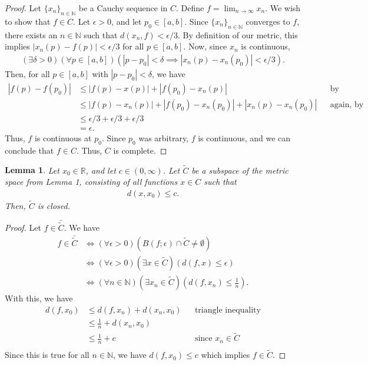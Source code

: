 \documentclass[10pt,a4paper]{article}
\theoremstyle{theorem}
\newtheorem{lemma}{Lemma}
\theoremstyle{definition}
\begin{document}
\begin{proof}
Let $\{x_n\}_{n \in \mathbb{N}}$ be a Cauchy sequence in $C$.  Define $f = \lim_{n \to \infty} x_n$.  We wish to show that $f \in C$. Let $\epsilon > 0$, and let $p_0 \in [a, b]$. Since $\{x_n\}_{n \in \mathbb{N}}$ converges to $f$, there exists an $n \in \mathbb{N}$ such that $d(x_n, f) < \epsilon/3$. By definition of our metric, this implies $|x_n(p) - f(p)| < \epsilon/3$ for all $p \in [a, b]$.  Now, since $x_n$ is continuous, 
\begin{align*}
(\exists \delta > 0)(\forall p \in [a, b])(|p - p_0| < \delta \implies |x_n(p) - x_n(p_0)| < \epsilon/3).
\end{align*}
Then, for all $p \in [a, b]$ with $|p-p_0| < \delta$, we have 
\begin{align*}
|f(p) - f(p_0)| &\leq |f(p) - x(p)|  + |f(p_0) - x_n(p)| && \text{by triangle inequality}\\
&\leq |f(p) - x_n(p)|  + |f(p_0) - x_n(p_0)|  + |x_n(p) - x_n(p_0)| && \text{again, by triangle inequality}\\
&\leq  \epsilon/3 +  \epsilon/3 +  \epsilon/3\\
&= \epsilon.
\end{align*}
Thus, $f$ is continuous at $p_0$. Since $p_0$ was arbitrary, $f$ is continuous, and we can conclude that $f \in C$. Thus, $C$ is complete.
\end{proof}

\begin{lemma}
Let $x_0 \in \mathbb{R}$, and let $c \in (0, \infty)$. Let $\tilde{C}$ be a subspace of the metric space from Lemma 1, consisting of all functions $x \in C$ such that 
\begin{align*}
d(x, x_0) \leq c.
\end{align*}
Then, $\tilde{C}$ is closed.
\end{lemma}

\begin{proof}
Let $f \in \bar{\tilde{C}}$.  We have
\begin{align*}
f \in \bar{\tilde{C}} &\iff (\forall \epsilon > 0)(B(f; \epsilon) \cap \tilde{C} \not = \emptyset)\\
&\iff (\forall \epsilon > 0)(\exists x \in \tilde{C})(d(f, x) \leq \epsilon)\\
&\iff (\forall n \in \mathbb{N})(\exists x_n \in \tilde{C})(d(f, x_n) \leq \frac{1}{n}).
\end{align*}
With this, we have
\begin{align*}
d(f, x_0) &\leq d(f, x_n) + d(x_n, x_0) && \text{triangle inequality}\\
&\leq \frac{1}{n} + d(x_n, x_0)\\
&\leq \frac{1}{n} + c && \text{since } x_n \in \tilde{C}\\
\end{align*}
Since this is true for all $n \in \mathbb{N}$, we have $d(f, x_0) \leq c$ which implies $f \in \tilde{C}$.
\end{proof}
\end{document}
